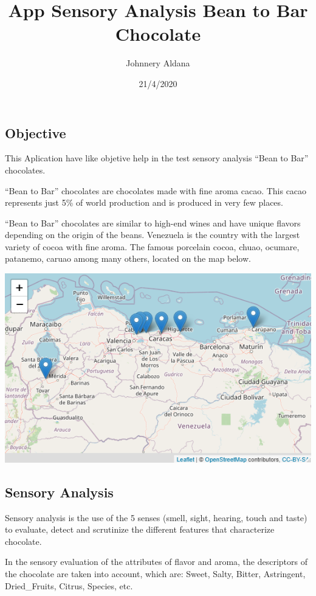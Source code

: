 \documentclass[]{article}
\title{App Sensory Analysis Bean to Bar Chocolate}
\author{Johnnery Aldana}
\date{21/4/2020}
\begin{document}
\maketitle

\hypertarget{objective}{%
\subsection{Objective}\label{objective}}

This Aplication have like objetive help in the test sensory analysis
``Bean to Bar'' chocolates.

``Bean to Bar'' chocolates are chocolates made with fine aroma cacao.
This cacao represents just 5\% of world production and is produced in
very few places.

``Bean to Bar'' chocolates are similar to high-end wines and have unique
flavors depending on the origin of the beans. Venezuela is the country
with the largest variety of cocoa with fine aroma. The famous porcelain
cocoa, chuao, ocumare, patanemo, caruao among many others, located on
the map below.

\includegraphics[width=5.74in]{CACAO_VENEZUELA}

\hypertarget{sensory-analysis}{%
\subsection{Sensory Analysis}\label{sensory-analysis}}

Sensory analysis is the use of the 5 senses (smell, sight, hearing,
touch and taste) to evaluate, detect and scrutinize the different
features that characterize chocolate.

In the sensory evaluation of the attributes of flavor and aroma, the
descriptors of the chocolate are taken into account, which are: Sweet,
Salty, Bitter, Astringent, Dried\_Fruits, Citrus, Species, etc.
\end{document}
